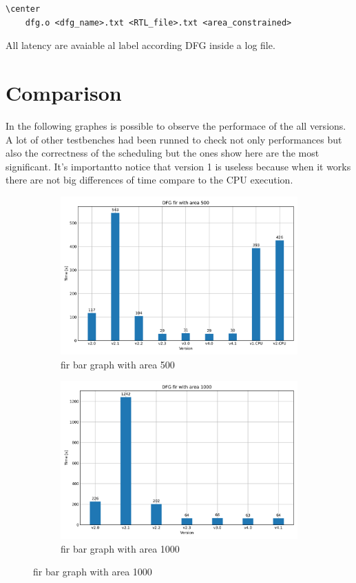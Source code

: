 \begin{lstlisting}
\center
    dfg.o <dfg_name>.txt <RTL_file>.txt <area_constrained>
\end{lstlisting}

All latency are avaiable al label according DFG inside a log file.

\section{Comparison}

In the following graphes is possible to observe the performace of the all versions. A lot of other
testbenches had been runned to check not only performances but also the correctness of the scheduling but the ones
show here are the most significant.
It's importantto notice that version 1 is useless because when it works there are not big differences of time
compare to the CPU execution.

\begin{figure}[!h]
    \centering
    \begin{subfigure}{.45\textwidth}
        \centering
        \includegraphics[width=.95\linewidth]{chapters/figures/fir_500.png}  
        \caption{fir bar graph with area 500}
        \label{fig:fir_500}
    \end{subfigure}
    \begin{subfigure}{.45\textwidth}
        \centering
        \includegraphics[width=.95\linewidth]{chapters/figures/fir_1000.png}  
        \caption{fir bar graph with area 1000}
        \label{fig:fir_1000}
    \end{subfigure}
\end{figure}

